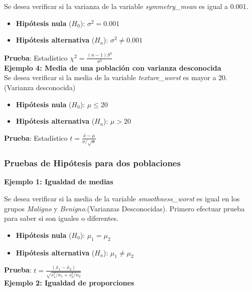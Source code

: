 \documentclass[a4paper, 12pt]{article}
\begin{document}
Se desea verificar si la varianza de la variable \textit{symmetry\_mean} es igual a 0.001. 

\begin{itemize}
	\item \textbf{Hipótesis nula} (\(H_0\)): \(\sigma^2 = 0.001\)
	\item \textbf{Hipótesis alternativa} (\(H_a\)): \(\sigma^2 \neq 0.001\)
\end{itemize}

\textbf{Prueba}: Estadístico \(\chi^2 = \frac{(n-1)S^2}{\sigma^2}\)\\
\textbf{Ejemplo 4: Media de una población con varianza desconocida}\\

Se desea verificar si la media de la variable \textit{texture\_worst} es mayor a 20.(Varianza desconocida)

\begin{itemize}
	\item \textbf{Hipótesis nula} (\(H_0\)): \(\mu \leq 20\)
	\item \textbf{Hipótesis alternativa} (\(H_a\)): \(\mu > 20\)
\end{itemize}

\textbf{Prueba}: Estadístico \( t = \frac{\bar{x} - \mu}{\sigma / \sqrt{n}} \)\\


\subsubsection{Pruebas de Hipótesis para dos poblaciones}

\textbf{Ejemplo 1: Igualdad de medias}

Se desea verificar si la media de la variable \textit{smoothness\_worst} es igual en los grupos \textit{Maligno} y \textit{Benigno}.(Varianzas Desconocidas).
Primero efectuar prueba para saber si son iguales o diferentes.

\begin{itemize}
	\item \textbf{Hipótesis nula} (\(H_0\)): \(\mu_1 = \mu_2\)
	\item \textbf{Hipótesis alternativa} (\(H_a\)): \(\mu_1 \neq \mu_2\)
\end{itemize}

\textbf{Prueba}: \(t = \frac{(\bar{x}_1 - \bar{x}_2)}{\sqrt{s_1^2/n_1 + s_2^2/n_2}}\)\\

\textbf{Ejemplo 2: Igualdad de proporciones}\\
\end{document}
